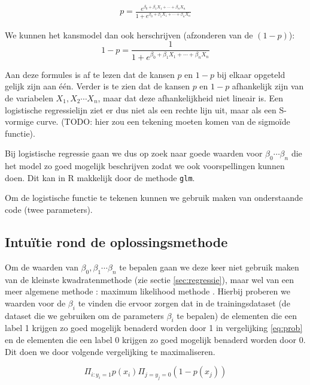\begin{eqnarray}
	p = \frac{e^{\beta_0 + \beta_1 X_1 + \cdots + \beta_n X_n }}{1+ e^{\beta_0 + \beta_1 X_1 + \cdots + \beta_n X_n }}
	\label{eq:prob}
\end{eqnarray} 



We kunnen het kansmodel dan ook herschrijven (afzonderen van de $(1-p)$):
\[ 
1-p = \frac{1}{1+ e^{\beta_0 + \beta_1 X_1 + \cdots + \beta_n X_n }}
\]

Aan deze formules is af te lezen dat de kansen $p$ en $1-p$ bij elkaar opgeteld gelijk zijn aan \'e\'en.
Verder is te zien dat de kansen $p$ en $1-p$ afhankelijk zijn van de variabelen $X_1, X_2 \cdots X_n$, maar dat deze afhankelijkheid niet lineair is. Een logistische regressielijn ziet er dus niet als een rechte lijn
uit, maar als een S-vormige curve. (TODO: hier zou een tekening moeten komen van de sigmo\"ide functie).

Bij logistische regressie gaan we dus op zoek naar goede waarden voor $\beta_0 \cdots \beta_n$ die het model zo goed mogelijk beschrijven zodat we ook voorspellingen kunnen doen. Dit kan in R makkelijk door de methode \texttt{glm}.

Om de logistische functie te tekenen kunnen we gebruik maken van onderstaande code (twee parameters).



\subsection{Intu\"itie rond de oplossingsmethode}
Om de waarden van $\beta_0, \beta_1 \cdots \beta_n$ te bepalen gaan we deze keer niet gebruik maken van de kleinste kwadratenmethode (zie sectie \ref{sec:regressie}), maar wel van een meer algemene methode : maximum likelihood methode . Hierbij proberen we waarden voor de $\beta_i$ te vinden die ervoor zorgen dat in de trainingsdataset (de dataset die we gebruiken om de parameters $\beta_i$ te bepalen) de elementen die een label 1 krijgen zo goed mogelijk benaderd worden door 1 in vergelijking \ref{eq:prob} en de elementen die een label 0 krijgen zo goed mogelijk benaderd worden door 0. Dit doen we door volgende vergelijking te maximaliseren. 

\begin{equation}
	\Pi_{i: y_i=1} p(x_i) \Pi_{j= y_j = 0} (1 - p(x_j)) 
\end{equation}

